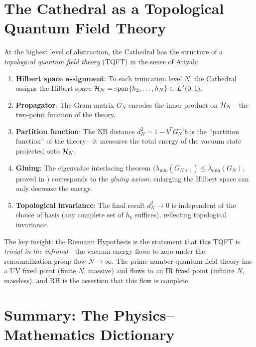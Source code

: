 \documentclass[11pt,a4paper]{article}
\begin{document}
\section{The Cathedral as a Topological Quantum Field Theory}
\label{sec:tqft}

At the highest level of abstraction, the Cathedral has the structure
of a \emph{topological quantum field theory} (TQFT) in the sense
of Atiyah:

\begin{enumerate}
  \item \textbf{Hilbert space assignment}: To each truncation level $N$,
    the Cathedral assigns the Hilbert space
    $\mathcal{H}_N = \operatorname{span}\{h_2, \ldots, h_N\} \subset L^2(0,1)$.

  \item \textbf{Propagator}: The Gram matrix $G_N$ encodes the inner
    product on $\mathcal{H}_N$---the two-point function of the theory.

  \item \textbf{Partition function}: The NB distance $d_N^2 = 1 - b^T G_N^{-1} b$
    is the ``partition function'' of the theory---it measures the total
    energy of the vacuum state projected onto $\mathcal{H}_N$.

  \item \textbf{Gluing}: The eigenvalue interlacing theorem
    ($\lambda_{\min}(G_{N+1}) \leq \lambda_{\min}(G_N)$, proved in
    ) corresponds to the \emph{gluing
    axiom}: enlarging the Hilbert space can only decrease the energy.

  \item \textbf{Topological invariance}: The final result $d_N^2 \to 0$
    is independent of the choice of basis (any complete set of $h_k$
    suffices), reflecting topological invariance.
\end{enumerate}

The key insight: the Riemann Hypothesis is the statement that this
TQFT is \emph{trivial in the infrared}---the vacuum energy flows to
zero under the renormalization group flow $N \to \infty$. The prime
number quantum field theory has a UV fixed point (finite $N$, massive)
and flows to an IR fixed point (infinite $N$, massless), and RH is the
assertion that this flow is complete.

\section{Summary: The Physics--Mathematics Dictionary}
\label{sec:summary}
\end{document}
